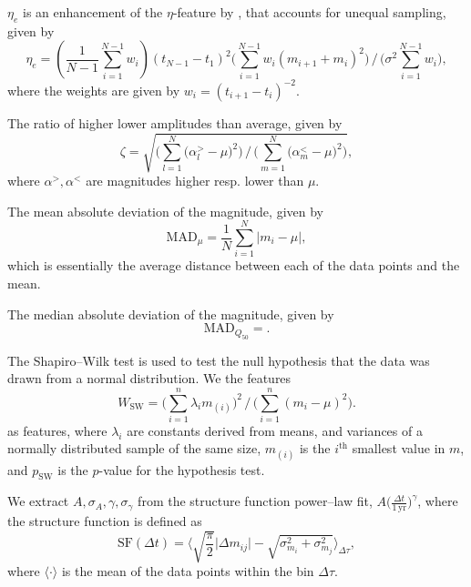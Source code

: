\begin{enumerate}
 $\eta_e$ is an enhancement of the $\eta$-feature by \citet{kim2014}, that accounts for unequal sampling, given by
\begin{equation}\eta_e = (\frac{1}{N-1}\sum_{i=1}^{N-1} w_i) (t_{N-1} - t_1)^2 \big( \sum\limits_{i=1}^{N-1} w_i (m_{i+1} + m_i)^2 \big) \, / \, \big( \sigma^2 \sum\limits_{i=1}^{N-1} w_i \big),\end{equation}
where the weights are given by $w_i = (t_{i+1} - t_i)^{-2}$.

 The ratio of higher \resp lower amplitudes than average, given by
\begin{equation}\zeta = \sqrt{ \Big(\sum\limits_{l=1}^N \big( \alpha^{>}_l - \mu \big)^2\Big) \, / \, \Big(\sum\limits_{m=1}^N \big( \alpha^{<}_m - \mu \big)^2\Big)},\end{equation}
where $\alpha^{>}, \alpha^{<}$ are magnitudes higher resp. lower than $\mu$.

 The mean absolute deviation of the magnitude, given by
\begin{equation}\text{MAD}_{\mu} = \frac{1}{N} \sum\limits_{i=1}^{N} | m_i - \mu |,\end{equation}
which is essentially the average distance between each of the data points and the mean.

 The median absolute deviation of the magnitude, given by
\begin{equation}\text{MAD}_{Q_{50}} = .\end{equation}

 The Shapiro--Wilk test \citep{shapiro1965} is used to test the null hypothesis that the data was drawn from a normal distribution. We the features
\begin{equation}W_{\text{SW}} = \big(\sum\limits_{i=1}^n \lambda_i m_{(i)}\big)^2 \, / \, \big(\sum\limits_{i=1}^n (m_i - \mu)^2\big).\end{equation}
as features, where $\lambda_i$ are constants derived from means, and variances of a normally distributed sample of the same size, $m_{(i)}$ is the $i^\text{th}$ smallest value in $m$, and $p_{\text{SW}}$ is the $p$-value for the hypothesis test.

 We extract $A, \sigma_A, \gamma, \sigma_\gamma$ from the structure function power--law fit, $A \big(\frac{\Delta t}{1 \, \mathrm{yr}}\big)^\gamma$, where the structure function is defined as
\begin{equation}\text{SF}(\Delta t) = \big\langle \sqrt{\frac{\pi}{2}} \big| \Delta m_{ij}  \big| - \sqrt{\sigma_{m_i}^2 + \sigma_{m_j}^2} \big\rangle_{\Delta \tau},\end{equation}
where $\langle \cdot \rangle$ is the mean of the data points within the bin $\Delta \tau$.


\end{enumerate}
